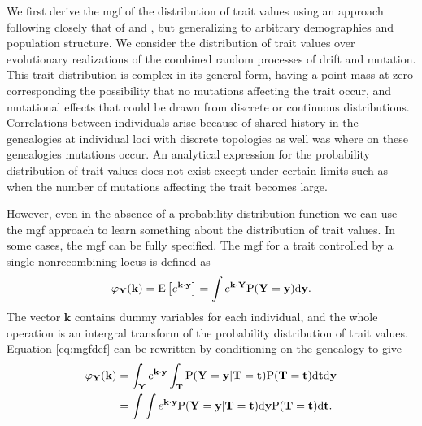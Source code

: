 We first derive the mgf of the distribution of trait values using an approach
following closely that of \citet{Schraiber2015} and \citet{Khaitovich2005}, but
generalizing to arbitrary demographies and population structure. We consider the
distribution of trait values over evolutionary realizations of the combined
random processes of drift and mutation. This trait distribution is complex in
its general form, having a point mass at zero corresponding the possibility that
no mutations affecting the trait occur, and mutational effects that could be
drawn from discrete or continuous distributions. Correlations between
individuals arise because of shared history in the genealogies at individual
loci with discrete topologies as well was where on these genealogies mutations
occur. An analytical expression for the probability distribution of trait values
does not exist except under certain limits such as when the number of mutations
affecting the trait becomes large.

However, even in the absence of a probability distribution function we can use
the mgf approach to learn something about the distribution of trait values. In
some cases, the mgf can be fully specified. The mgf for a trait controlled by a
single nonrecombining locus is defined as
\begin{equation}
  \label{eq:mgfdef}
  \varphi_{\mathbf{Y}}(\mathbf{k}) = \mathrm{E}\left[ e^{\mathbf{k} \cdot \mathbf{y}} \right] =
  \int e^{\mathbf{k} \cdot \mathbf{Y}} \mathrm{P}(\mathbf{Y}=\mathbf{y}) \mbox{d}\mathbf{y}.
\end{equation}
The vector $\mathbf{k}$ contains dummy variables for each individual, and the
whole operation is an intergral transform of the probability distribution of
trait values. Equation \eqref{eq:mgfdef} can be rewritten by conditioning on the
genealogy to give
\begin{align}
  \label{eq:cond}
  \varphi_{\mathbf{Y}}(\mathbf{k}) &= \int_{\mathbf{Y}} e^{\mathbf{k} \cdot \mathbf{y}}
  \int_{\mathbf{T}} \mathrm{P}(\mathbf{Y}=\mathbf{y} | \mathbf{T}=\mathbf{t}) \mathrm{P}(\mathbf{T}=\mathbf{t})
  \mbox{d}\mathbf{t} \mbox{d}\mathbf{y} \nonumber \\
  &= \int \int e^{\mathbf{k} \cdot \mathbf{y}} \mathrm{P}(\mathbf{Y}=\mathbf{y} | \mathbf{T}=\mathbf{t}) \mbox{d}\mathbf{y}
  \mathrm{P}(\mathbf{T}=\mathbf{t})
  \mbox{d}\mathbf{t}.
\end{align}

